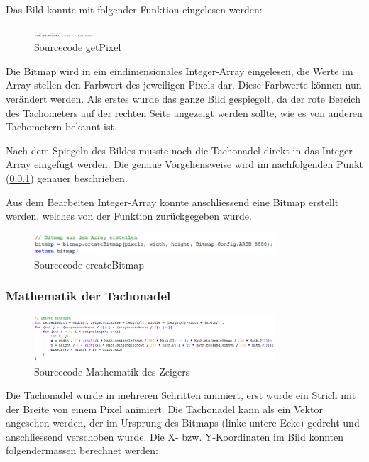 Das Bild konnte mit folgender Funktion eingelesen werden:

\begin{figure}[ht]
    \includegraphics[width=0.2\textwidth]{3Vorgehen/imag/app_getPixel.png}
    \caption{Sourcecode getPixel}
	\label{app_getPixel} 
\end{figure}

Die Bitmap wird in ein eindimensionales Integer-Array eingelesen, die Werte im Array stellen den Farbwert des jeweiligen Pixels dar. Diese Farbwerte können nun verändert werden. Als erstes wurde das ganze Bild gespiegelt, da der rote Bereich des Tachometers auf der rechten Seite angezeigt werden sollte, wie es von anderen Tachometern bekannt ist.

Nach dem Spiegeln des Bildes musste noch die Tachonadel direkt in das Integer-Array eingefügt werden. Die genaue Vorgehensweise wird im nachfolgenden Punkt (\ref{math_tachonadel}) genauer beschrieben.

Aus dem Bearbeiten Integer-Array konnte anschliessend eine Bitmap erstellt werden, welches von der Funktion zurückgegeben wurde. 

\begin{figure}[ht]
    \includegraphics[width=0.8\textwidth]{3Vorgehen/imag/app_createBitmap.png}
    \caption{Sourcecode createBitmap}
	\label{app_createBitmap} 
\end{figure}

\subsubsection{Mathematik der Tachonadel}
\label{math_tachonadel}

\begin{figure}[ht]
    \includegraphics[width=0.8\textwidth]{3Vorgehen/imag/app_drawNeedle.png}
    \caption{Sourcecode Mathematik des Zeigers}
	\label{app_drawNeedle} 
\end{figure}

Die Tachonadel wurde in mehreren Schritten animiert, erst wurde ein Strich mit der Breite von einem Pixel animiert. Die Tachonadel kann als ein Vektor angesehen werden, der im Ursprung des Bitmaps (linke untere Ecke) gedreht und anschliessend verschoben wurde. Die X- bzw. Y-Koordinaten im Bild konnten folgendermassen berechnet werden:

